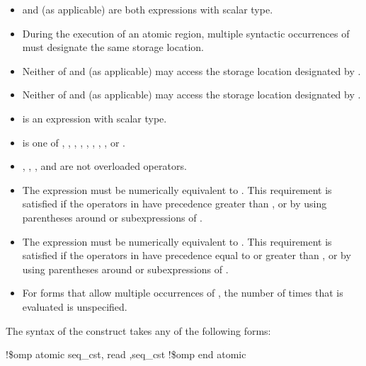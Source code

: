 \begin{itemize}
\item {} and  (as applicable) are both  expressions with scalar type.

\item During the execution of an atomic region, multiple syntactic occurrences of  must 
designate the same storage location.

\item Neither of  and  (as applicable) may access the storage location designated by .

\item Neither of  and  (as applicable) may access the storage location designated by .

\item {} is an expression with scalar type. 

\item {} is one of \code{+}, \code{*}, \code{-}, \code{/}, 
\code{\&}, \code{\^}, \code{|}, \code{\textless \hspace{0.05em}\textless}, or 
\code{\textgreater \hspace{0.05em}\textgreater}.

\item {}, \code{=}, \code{++}, and \code{\--\--} are not overloaded operators.

\item The expression    must be numerically equivalent to 
  . This 
requirement is satisfied if the operators in  have precedence greater than , 
or by using parentheses around  or subexpressions of .

\item The expression    must be numerically equivalent to 
  . This 
requirement is satisfied if the operators in  have precedence equal to or greater 
than , or by using parentheses around  or subexpressions of .

\item For forms that allow multiple occurrences of , the number of times that  is 
evaluated is unspecified.
\end{itemize}
\ccppspecificend

\begin{samepage}
\fortranspecificstart
The syntax of the  construct takes any of the following forms: 

\begin{boxedcode}
!\$omp atomic \plc{[}seq\_cst\plc{[},\plc{]]} read \plc{[[},\plc{]}seq\_cst\plc{]}
\plc{[}!\$omp end atomic\plc{]}
\end{boxedcode}
\end{samepage}

